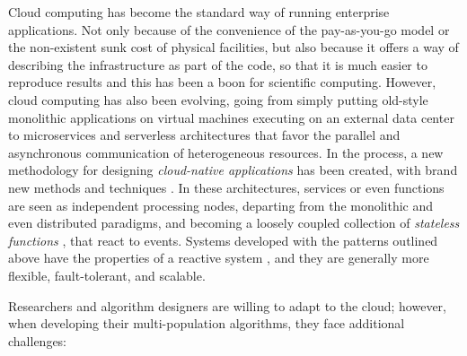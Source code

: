 \documentclass[review]{elsarticle}
\begin{document}
Cloud computing has become the standard way of running
enterprise applications.  Not only because of the convenience of the
pay-as-you-go model or the non-existent sunk cost of physical facilities, but also because
it offers a way of describing the infrastructure as part of the code, so that it
is much easier to reproduce results and this has been a boon for scientific
computing.  
However,  cloud computing has also been evolving, going from simply
putting old-style monolithic applications on virtual machines executing on an external 
data center to microservices \cite{microservices} and serverless architectures \cite{varghese2018next,Varghese2018849} 
that favor the parallel and asynchronous communication of
heterogeneous resources. In the process, a new methodology for designing 
{\em cloud-native applications} has been created, with brand new methods and
techniques \cite{Baldini2016287}. 
In these architectures, services or even functions are seen as independent 
processing nodes, departing from the monolithic
and even distributed paradigms, and becoming a loosely coupled collection of {\em
stateless functions} \cite{malawski2017serverless}, that react to events. 
Systems developed with the patterns outlined above have the
properties of a reactive system \cite{boner2014reactive}, and they are generally 
more flexible, fault-tolerant, and scalable. %

Researchers and algorithm designers are willing to adapt to the cloud; 
however, when developing their multi-population algorithms, they face additional challenges:
\end{document}
